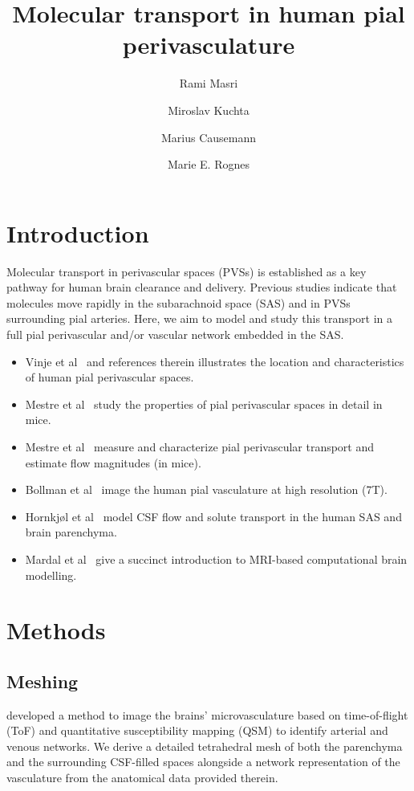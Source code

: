 \documentclass[fleqn,10pt]{wlscirep}
\title{Molecular transport in human pial perivasculature}
\author[1,x]{Rami Masri}
\author[1,x]{Miroslav Kuchta}
\author[1,x]{Marius Causemann}
\author[1,*]{Marie E. Rognes}
\affil[1]{Department of Numerical Analysis and Scientific Computing, Simula Research Laboratory, Oslo, Norway}
\affil[x]{Author order to be discussed.}
\affil[*]{meg@simula.no}
\begin{document}
\flushbottom
\maketitle
%
%
\thispagestyle{empty}

\section*{Introduction}

Molecular transport in perivascular spaces (PVSs) is established as a key pathway for human brain clearance and delivery. Previous studies indicate that molecules move rapidly in the subarachnoid space (SAS) and in PVSs surrounding pial arteries. Here, we aim to model and study this transport in a full pial perivascular and/or vascular network embedded in the SAS.  

\begin{itemize}
\item Vinje et al~\cite{vinje2021brain} and references therein illustrates the location and characteristics of human pial perivascular spaces.
\item Mestre et al~\cite{mestre2022periarteriolar} study the properties of pial perivascular spaces in detail in mice.
\item Mestre et al~\cite{mestre2018flow} measure and characterize pial perivascular transport and estimate flow magnitudes (in mice).
\item Bollman et al~\cite{bollmann2022imaging} image the human pial vasculature at high resolution (7T).
\item Hornkjøl et al~\cite{hornkjol2022csf} model CSF flow and solute transport in the human SAS and brain parenchyma. 
\item Mardal et al~\cite{mardal2022mathematical} give a succinct introduction to MRI-based computational brain modelling. 
\end{itemize}

\section*{Methods}

\subsection*{Meshing}

\citet{hodneland2019new} developed a method to image the brains' microvasculature based on time-of-flight (ToF) and quantitative susceptibility mapping (QSM) to identify arterial and venous networks.
We derive a detailed tetrahedral mesh of both the parenchyma and the surrounding CSF-filled spaces alongside a network representation of the vasculature from the anatomical data provided therein. 
\end{document}
